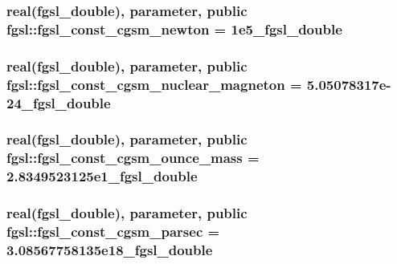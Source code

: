 \subsubsection[{fgsl\+\_\+const\+\_\+cgsm\+\_\+newton}]{\setlength{\rightskip}{0pt plus 5cm}real({\bf fgsl\+\_\+double}), parameter, public fgsl\+::fgsl\+\_\+const\+\_\+cgsm\+\_\+newton = 1e5\+\_\+fgsl\+\_\+double}\label{namespacefgsl_a1130bb96c29d828c350ca8882cac2a6d}
\hypertarget{namespacefgsl_a31fef82c84b5351ce89d573f6be1eb8f}{}
\subsubsection[{fgsl\+\_\+const\+\_\+cgsm\+\_\+nuclear\+\_\+magneton}]{\setlength{\rightskip}{0pt plus 5cm}real({\bf fgsl\+\_\+double}), parameter, public fgsl\+::fgsl\+\_\+const\+\_\+cgsm\+\_\+nuclear\+\_\+magneton = 5.\+05078317e-\/24\+\_\+fgsl\+\_\+double}\label{namespacefgsl_a31fef82c84b5351ce89d573f6be1eb8f}
\hypertarget{namespacefgsl_aef077a68e7fdd2fe6ec932a7f3c1e8bc}{}
\subsubsection[{fgsl\+\_\+const\+\_\+cgsm\+\_\+ounce\+\_\+mass}]{\setlength{\rightskip}{0pt plus 5cm}real({\bf fgsl\+\_\+double}), parameter, public fgsl\+::fgsl\+\_\+const\+\_\+cgsm\+\_\+ounce\+\_\+mass = 2.\+8349523125e1\+\_\+fgsl\+\_\+double}\label{namespacefgsl_aef077a68e7fdd2fe6ec932a7f3c1e8bc}
\hypertarget{namespacefgsl_a3eb251959ceffa5d3604d70bd5279f02}{}
\subsubsection[{fgsl\+\_\+const\+\_\+cgsm\+\_\+parsec}]{\setlength{\rightskip}{0pt plus 5cm}real({\bf fgsl\+\_\+double}), parameter, public fgsl\+::fgsl\+\_\+const\+\_\+cgsm\+\_\+parsec = 3.\+08567758135e18\+\_\+fgsl\+\_\+double}\label{namespacefgsl_a3eb251959ceffa5d3604d70bd5279f02}
\hypertarget{namespacefgsl_a97e19ca0cdcef10fb78328e155bc5671}{}
